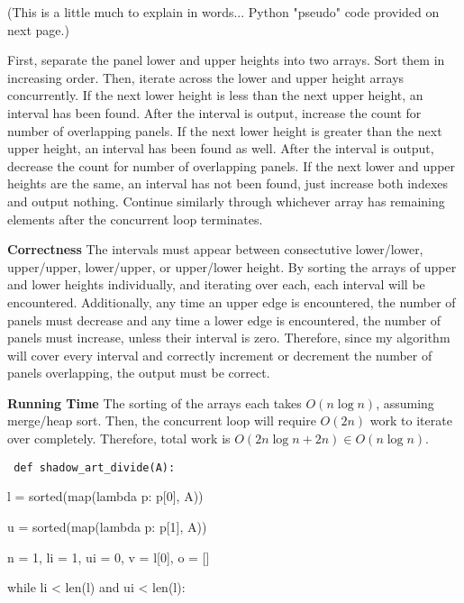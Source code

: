 \documentclass[12pt,twoside]{article}
\begin{document}
\begin{problems}
\begin{problemparts}
\end{problemparts}

\newpage
{} (This is a little much to explain in words...
    Python "pseudo" code provided on next page.)
    
    First, separate the panel lower and upper heights into two arrays. Sort
    them in increasing order. Then, iterate across the lower and upper height
    arrays concurrently. If the next lower height is less than the next upper
    height, an interval has been found. After the interval is output,
    increase the count for number of overlapping panels. If the next lower
    height is greater than the next upper height, an interval has been found
    as well. After the interval is output, decrease the count for number of
    overlapping panels. If the next lower and upper heights are the same, an
    interval has not been found, just increase both indexes and output
    nothing. Continue similarly through whichever array has remaining
    elements after the concurrent loop terminates.

    \smallbreak

    {\bf Correctness} The intervals must appear between consectutive
    lower/lower, upper/upper, lower/upper, or upper/lower height. By sorting
    the arrays of upper and lower heights individually, and iterating over
    each, each interval will be encountered. Additionally, any time an upper
    edge is encountered, the number of panels must decrease and any time a
    lower edge is encountered, the number of panels must increase, unless
    their interval is zero. Therefore, since my algorithm will cover every
    interval and correctly increment or decrement the number of panels
    overlapping, the output must be correct.

    \smallbreak

    {\bf Running Time} The sorting of the arrays each takes $ O(n \log n ) $,
    assuming merge/heap sort. Then, the concurrent loop will require $ O(2n)
    $ work to iterate over completely. Therefore, total work is $ O(2 n \log
    n + 2n) \in O(n \log n) $.

\newpage

{\tt
def shadow\_art\_divide(A):

\quad l = sorted(map(lambda p: p[0], A))

\quad     u = sorted(map(lambda p: p[1], A))

\quad     n = 1, li = 1, ui = 0, v = l[0], o = []

\quad     while li < len(l) and ui < len(l):

}
\end{problems}
\end{document}
